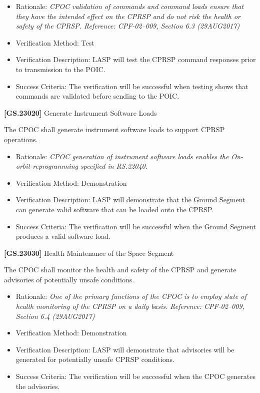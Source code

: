 \documentclass[12pt,oneside,oldfontcommands]{memoir}
\begin{document}
\begin{itemize}
\item{} Rationale: \emph{CPOC validation of commands and command loads ensure that they have the intended effect on the CPRSP and do not risk the health or safety of the CPRSP. Reference: CPF-02--009, Section 6.3 (29AUG2017)}

\item{} Verification Method: Test

\item{} Verification Description: \gls{LASP} will \gls{test} the \gls{CPRSP} command responses prior to transmission to the \gls{POIC}.

\item{} Success Criteria: The verification will be successful when \gls{test}ing shows that commands are validated before sending to the \gls{POIC}.

\end{itemize}

\textbf{[GS.23020]} Generate Instrument Software Loads

The \gls{CPOC} shall generate instrument software loads to support \gls{CPRSP} operations.

\begin{itemize}
\item{} Rationale: \emph{CPOC generation of instrument software loads enables the On-orbit reprogramming specified in RS.22040.}

\item{} Verification Method: Demonstration

\item{} Verification Description: \gls{LASP} will demonstrate that the Ground Segment can generate valid software that can be loaded onto the \gls{CPRSP}.

\item{} Success Criteria: The verification will be successful when the Ground Segment produces a valid software load.

\end{itemize}

\textbf{[GS.23030]} Health Maintenance of the Space Segment

The \gls{CPOC} shall monitor the health and safety of the \gls{CPRSP} and generate advisories of potentially unsafe conditions.

\begin{itemize}
\item{} Rationale: \emph{One of the primary functions of the CPOC is to employ state of health monitoring of the CPRSP on a daily basis. Reference: CPF-02--009, Section 6.4 (29AUG2017)}

\item{} Verification Method: Demonstration

\item{} Verification Description: \gls{LASP} will demonstrate that advisories will be generated for potentially unsafe \gls{CPRSP} conditions.

\item{} Success Criteria: The verification will be successful when the \gls{CPOC} generates the advisories.

\end{itemize}
\end{document}
